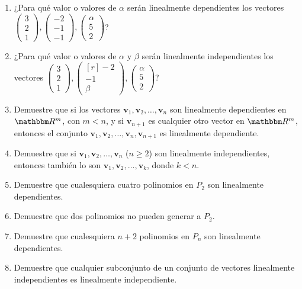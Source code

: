 \begin{enumerate}[start=90]
    \item ¿Para qué valor o valores de $\alpha$ serán linealmente dependientes los vectores $\begin{pmatrix*}3 \\ 2 \\ 1\end{pmatrix*},\begin{pmatrix*}-2 \\ -1 \\ -1\end{pmatrix*},\begin{pmatrix*}\alpha \\ 5 \\ 2\end{pmatrix*}$?
    \item ¿Para qué valor o valores de $\alpha$ y $\beta$ serán linealmente independientes los vectores $\begin{pmatrix*}3 \\ 2 \\ 1\end{pmatrix*},\begin{pmatrix*}[r]-2 \\ -1 \\ \beta\end{pmatrix*},\begin{pmatrix*}\alpha \\ 5 \\ 2\end{pmatrix*}$?
    \newpage
    \item Demuestre que si los vectores $\mathbf{v}_{1}, \mathbf{v}_{2}, \dots, \mathbf{v}_{n}$ son linealmente dependientes en $\RR[m]$, con $m<n$, y si $\mathbf{v}_{n+1}$ es cualquier otro vector en $\RR[m]$, entonces el conjunto $\mathbf{v}_{1}, \mathbf{v}_{2}, \dots, \mathbf{v}_{n}, \mathbf{v}_{n+1}$ es linealmente dependiente.
    \item Demuestre que si $\mathbf{v}_{1}, \mathbf{v}_{2}, \dots, \mathbf{v}_{n}$ ($n \geq 2$) son linealmente independientes, entonces también lo son $\mathbf{v}_{1}, \mathbf{v}_{2}, \dots, \mathbf{v}_{k}$, donde $k<n$.
    \item Demuestre que cualesquiera cuatro polinomios en $P_{2}$ son linealmente dependientes.
    \item Demuestre que dos polinomios no pueden generar a $P_{2}$.
    \item Demuestre que cualesquiera $n+2$ polinomios en $P_{n}$ son linealmente dependientes.
    \item Demuestre que cualquier subconjunto de un conjunto de vectores linealmente independientes es linealmente independiente.

\end{enumerate}
